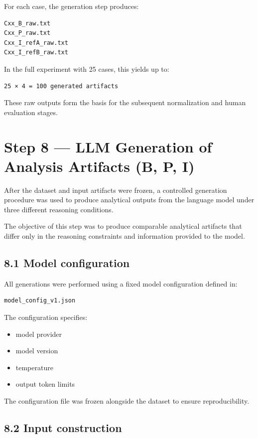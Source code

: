 {For each case, the generation step produces:

\begin{verbatim}
Cxx_B_raw.txt
Cxx_P_raw.txt
Cxx_I_refA_raw.txt
Cxx_I_refB_raw.txt
\end{verbatim}

In the full experiment with 25 cases, this yields up to:

\begin{verbatim}
25 × 4 = 100 generated artifacts
\end{verbatim}

These raw outputs form the basis for the subsequent normalization and human evaluation stages.

\section*{Step 8 — LLM Generation of Analysis Artifacts (B, P, I)}

After the dataset and input artifacts were frozen, a controlled generation procedure was used to produce analytical outputs from the language model under three different reasoning conditions.

The objective of this step was to produce comparable analytical artifacts that differ only in the reasoning constraints and information provided to the model.

\subsection*{8.1 Model configuration}

All generations were performed using a fixed model configuration defined in:

\begin{verbatim}
model_config_v1.json
\end{verbatim}

The configuration specifies:

\begin{itemize}
\item model provider
\item model version
\item temperature
\item output token limits
\end{itemize}

The configuration file was frozen alongside the dataset to ensure reproducibility.

\subsection*{8.2 Input construction}

}
